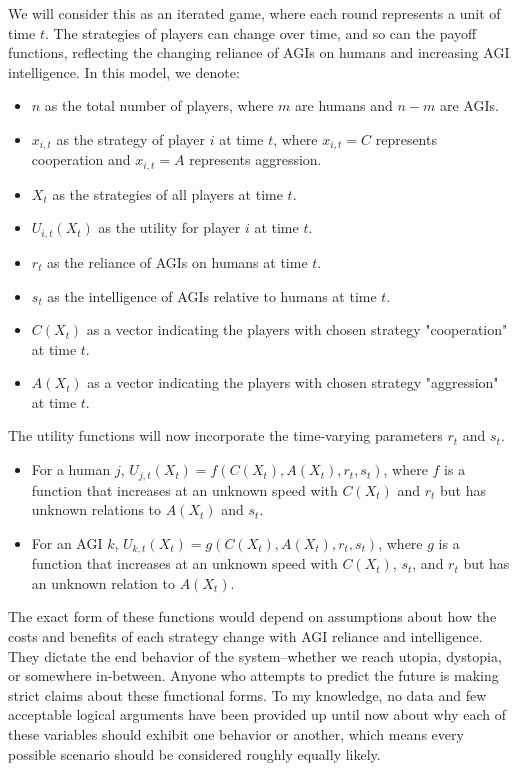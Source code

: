 \documentclass{article}[10pt]
\begin{document}
We will consider this as an iterated game, where each round represents a unit of time $t$. The strategies of players can change over time, and so can the payoff functions, reflecting the changing reliance of AGIs on humans and increasing AGI intelligence. In this model, we denote:
\begin{itemize}
    \item $n$ as the total number of players, where $m$ are humans and $n-m$ are AGIs.
    \item $x_{i,t}$ as the strategy of player $i$ at time $t$, where $x_{i,t} = C$ represents cooperation and $x_{i,t} = A$ represents aggression.
    \item $X_t$ as the strategies of all players at time $t$.
    \item $U_{i,t}(X_t)$ as the utility for player $i$ at time $t$.
    \item $r_t$ as the reliance of AGIs on humans at time $t$.
    \item $s_t$ as the intelligence of AGIs relative to humans at time $t$.
    \item $C(X_t)$ as a vector indicating the players with chosen strategy "cooperation" at time $t$.
    \item $A(X_t)$ as a vector indicating the players with chosen strategy "aggression" at time $t$.
\end{itemize}
The utility functions will now incorporate the time-varying parameters $r_t$ and $s_t$.
\begin{itemize}
    \item For a human $j$, $U_{j,t}(X_t) = f(C(X_t),A(X_t),r_t,s_t)$, where $f$ is a function that increases at an unknown speed with $C(X_t)$ and $r_t$ but has unknown relations to $A(X_t)$ and $s_t$.
    \item For an AGI $k$, $U_{k,t}(X_t) = g(C(X_t),A(X_t),r_t,s_t)$, where $g$ is a function that increases at an unknown speed with $C(X_t)$, $s_t$, and $r_t$ but has an unknown relation to $A(X_t)$.
\end{itemize}

The exact form of these functions would depend on assumptions about how the costs and benefits of each strategy change with AGI reliance and intelligence.
They dictate the end behavior of the system--whether we reach utopia, dystopia, or somewhere in-between.
Anyone who attempts to predict the future is making strict claims about these functional forms.
To my knowledge, no data and few acceptable logical arguments have been provided up until now about why each of these variables should exhibit one behavior or another, which means every possible scenario should be considered roughly equally likely.\par
\end{document}
